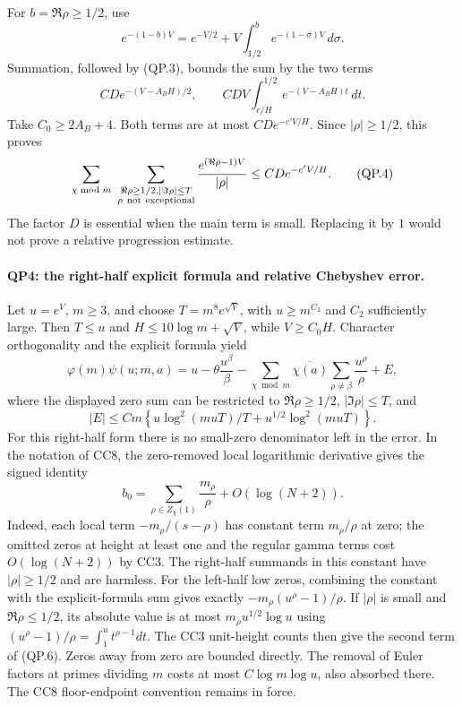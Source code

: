 For $b=\Re\rho\ge1/2$, use
\[
 e^{-(1-b)V}=e^{-V/2}+V\int_{1/2}^{b}e^{-(1-\sigma)V}\,d\sigma.
\]
Summation, followed by (QP.3), bounds the sum by the two terms
\[
 CD e^{-(V-A_BH)/2},\qquad CDV\int_{c/H}^{1/2}e^{-(V-A_BH)t}\,dt .
\]
Take $C_0\ge2A_B+4$.  Both terms are at most
$CD e^{-c'V/H}$.  Since $|\rho|\ge1/2$, this proves
\[
 \sum_{\chi\bmod m}\ \sum_{\substack{\Re\rho\ge1/2, |\Im\rho|\le T\cr
                                    \rho\ {\rm not\ exceptional}}}
       \frac{e^{(\Re\rho-1)V}}{|\rho|}
             \le C D e^{-c'V/H}.                       \tag{QP.4}
\]
The factor $D$ is essential when the main term is small.  Replacing it
by $1$ would not prove a relative progression estimate.

\paragraph{QP4: the right-half explicit formula and relative Chebyshev error.}
Let $u=e^V$, $m\ge3$, and choose
$T=m^8e^{\sqrt V}$, with $u\ge m^{C_2}$ and $C_2$ sufficiently large.
Then $T\le u$ and $H\le10\log m+\sqrt V$, while $V\ge C_0H$.
Character orthogonality and the explicit formula yield
\[
 \varphi(m)\psi(u;m,a)
 =u-\theta\frac{u^\beta}{\beta}
   -\sum_{\chi\bmod m}\overline{\chi(a)}
      \sum_{\rho\ne\beta}\frac{u^\rho}{\rho}+E,         \tag{QP.5}
\]
where the displayed zero sum can be restricted to
$\Re\rho\ge1/2$, $|\Im\rho|\le T$, and
\[
 |E|\le C m\left\{u\log^2(muT)/T+
                              u^{1/2}\log^2(muT)\right\}.\tag{QP.6}
\]
For this right-half form there is no small-zero denominator left in the
error.  In the notation of CC8, the zero-removed local logarithmic
derivative gives the signed identity
\[
 b_0=\sum_{\rho\in Z_\chi(1)}\frac{m_\rho}{\rho}
                         +O(\log(N+2)).
\]
Indeed, each local term $-m_\rho/(s-\rho)$ has constant term
$m_\rho/\rho$ at zero; the omitted zeros at height at least one and
the regular gamma terms cost $O(\log(N+2))$ by CC3.
The right-half summands in this constant have $|\rho|\ge1/2$ and
are harmless.  For the left-half low zeros, combining the constant
with the explicit-formula sum gives exactly
$-m_\rho(u^\rho-1)/\rho$.  If $|\rho|$ is small and $\Re\rho\le1/2$, its
absolute value is at most $m_\rho u^{1/2}\log u$ using
$(u^\rho-1)/\rho=\int_1^u t^{\rho-1}dt$.
The CC3 unit-height counts then give the second term of (QP.6).
Zeros away from zero are bounded directly.  The removal of Euler factors
at primes dividing $m$ costs at most $C\log m\log u$, also absorbed there.
The CC8 floor-endpoint convention remains in force.

